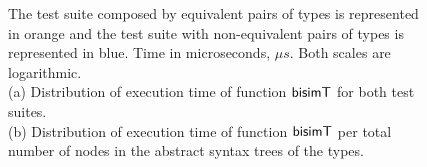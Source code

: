 \begin{figure}[t]
    \centering
    \caption{The test suite composed by equivalent pairs of types is represented in orange and the
    test suite with non-equivalent pairs of types is represented in blue. Time 
    in microseconds, $\mu s$. Both scales are logarithmic.\\
    (a) Distribution of execution time of function $\mathsf{bisimT}$ for both test suites.\\
    (b) Distribution of execution time of function $\mathsf{bisimT}$ per total number of nodes 
    in the abstract syntax trees of the types.}%
    \label{fig:results}%
\end{figure}


